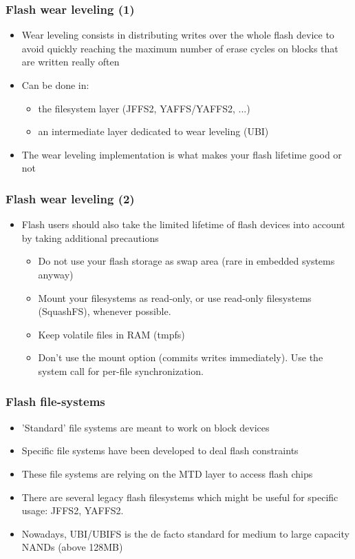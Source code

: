 \begin{frame}
  \frametitle{Flash wear leveling (1)}
  \begin{itemize}
  \item Wear leveling consists in distributing writes over the whole
    flash device to avoid quickly reaching the maximum number of erase
    cycles on blocks that are written really often
  \item Can be done in:
    \begin{itemize}
    \item the filesystem layer (JFFS2, YAFFS/YAFFS2, ...)
    \item an intermediate layer dedicated to wear leveling (UBI)
    \end{itemize}
  \item The wear leveling implementation is what makes your flash
    lifetime good or not
  \end{itemize}
\end{frame}

\begin{frame}
  \frametitle{Flash wear leveling (2)}
  \begin{itemize}
  \item Flash users should also take the limited lifetime of flash
    devices into account by taking additional precautions
    \begin{itemize}
    \item Do not use your flash storage as swap area (rare in embedded
      systems anyway)
    \item Mount your filesystems as read-only, or use read-only
      filesystems (SquashFS), whenever possible.
    \item Keep volatile files in RAM (tmpfs)
    \item Don't use the  mount option (commits writes
      immediately). Use the  system call for per-file
      synchronization.
    \end{itemize}
  \end{itemize}
\end{frame}

\begin{frame}
  \frametitle{Flash file-systems}
  \begin{itemize}
  \item 'Standard' file systems are meant to work on block devices
  \item Specific file systems have been developed to deal flash
    constraints
  \item These file systems are relying on the MTD layer to access
    flash chips
  \item There are several legacy flash filesystems which might be
    useful for specific usage: JFFS2, YAFFS2.
  \item Nowadays, UBI/UBIFS is the de facto standard for medium to
    large capacity NANDs (above 128MB)
  \end{itemize}
\end{frame}

